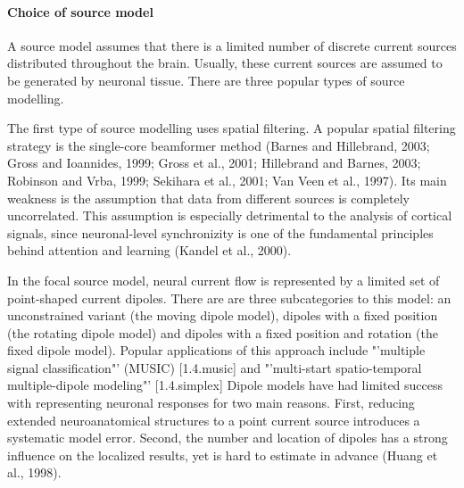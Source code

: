 \paragraph{Choice of source model}
A source model assumes that there is a limited number of discrete current sources distributed throughout the brain.
Usually, these current sources are assumed to be generated by neuronal tissue.
There are three popular types of source modelling.

The first type of source modelling uses spatial filtering.
A popular spatial filtering strategy is the single-core beamformer method (Barnes and Hillebrand, 2003; Gross and Ioannides, 1999; Gross et al., 2001; Hillebrand and Barnes, 2003; Robinson and Vrba, 1999; Sekihara et al., 2001; Van Veen et al., 1997).
Its main weakness is the assumption that data from different sources is completely uncorrelated.
This assumption is especially detrimental to the analysis of cortical signals, since neuronal-level synchronizity is one of the fundamental principles behind attention and learning (Kandel et al., 2000).

In the focal source model, neural current flow is represented by a limited set of point-shaped current dipoles.
There are are three subcategories to this model: an unconstrained variant (the moving dipole model), dipoles with a fixed position (the rotating dipole model) and dipoles with a fixed position and rotation (the fixed dipole model).
Popular applications of this approach include "'multiple signal classification"' (MUSIC) [1.4.music] and "'multi-start spatio-temporal multiple-dipole modeling"' [1.4.simplex]
Dipole models have had limited success with representing neuronal responses for two main reasons.
First, reducing extended neuroanatomical structures to a point current source introduces a systematic model error.
Second, the number and location of dipoles has a strong influence on the localized results, yet is hard to estimate in advance (Huang et al., 1998).

